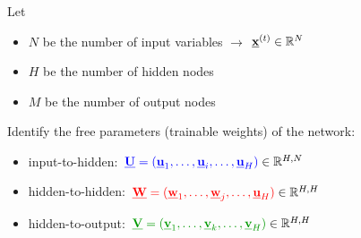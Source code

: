 \begin{frame}\frametitle{\subsubsecname}


Let
\begin{itemize}
\item[] $N$ be the number of input variables $\rightarrow$ $\underline{\mathbf{x}}^{(t)} \in \mathbb{R}^N$
\item[] $H$ be the number of hidden nodes
\item[] $M$ be the number of output nodes
\end{itemize}

\pause

Identify the free parameters (trainable weights) of the network:

\begin{itemize}
\item input-to-hidden: ${\color{blue} \underline{\mathbf{U}} = (\underline{\mathbf{u}}_1,\ldots, \underline{\mathbf{u}}_i, \ldots,\underline{\mathbf{u}}_H)} \in \mathbb{R}^{H,N}$
\item hidden-to-hidden: ${\color{red} \underline{\mathbf{W}} = (\underline{\mathbf{w}}_1,\ldots, \underline{\mathbf{w}}_j, \ldots,\underline{\mathbf{u}}_H)} \in \mathbb{R}^{H,H}$
\item hidden-to-output: ${\color{darkgreen} \vec V = (\vec v_1,\ldots, \vec v_k, \ldots,\vec v_H)} \in \R^{H,H}$
\end{itemize}




\end{frame}



